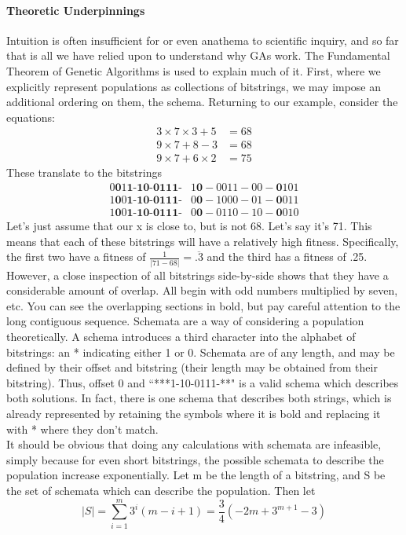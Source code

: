 \paragraph{Theoretic Underpinnings}
Intuition is often insufficient for or even anathema to scientific inquiry, and so far that is all we have relied upon to understand why GAs work.  The Fundamental Theorem of Genetic Algorithms is used to explain much of it.  First, where we explicitly represent populations as collections of bitstrings, we may impose an additional ordering on them, the schema.  Returning to our example, consider the equations: \begin{align*}
3 \times 7 \times 3 + 5 &= 68\\
9 \times 7 + 8 - 3 &= 68\\
9 \times 7 + 6 \times 2 &= 75
\end{align*}  
These translate to the bitstrings
\begin{align*}
0\textbf{0}1\textbf{1-10-0111-}&1\textbf{0}-0011-00-\textbf{0}101\\
1\textbf{0}0\textbf{1-10-0111-}&0\textbf{0}-1000-01-\textbf{0}011\\
1\textbf{0}0\textbf{1-10-0111-}&0\textbf{0}-0110-10-\textbf{0}010
\end{align*}
Let's just assume that our x is close to, but is not 68.  Let's say it's 71.  This means that each of these bitstrings will have a relatively high fitness.  Specifically, the first two have a fitness of $\frac{1}{|71-68|}=\overline{.3}$ and the third has a fitness of .25.   However, a close inspection of all bitstrings side-by-side shows that they have a considerable amount of overlap.  All begin with odd numbers multiplied by seven, etc.  You can see the overlapping sections in bold, but pay careful attention to the long contiguous sequence.
Schemata are a way of considering a population theoretically.  A schema introduces a third character into the alphabet of bitstrings:  an * indicating either 1 or 0.  Schemata are of any length, and may be defined by their offset and bitstring (their length may be obtained from their bitstring).  Thus, offset 0 and ``***1-10-0111-**" is a valid schema which describes both solutions.  In fact, there is one schema that describes both strings, which is already represented by retaining the symbols where it is bold and replacing it with * where they don't match.\\It should be obvious that doing any calculations with schemata are infeasible, simply because for even short bitstrings, the possible schemata to describe the population increase exponentially. Let m be the length of a bitstring, and S be the set of schemata which can describe the population.  Then let \begin{equation*}
	|S|=\sum_{i=1}^{m}3^i(m-i+1) = \frac{3}{4}(-2m+3^{m+1}-3)
	\end{equation*}
